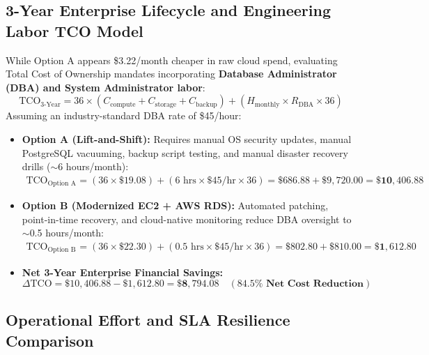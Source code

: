 \documentclass[11pt,a4paper]{article}
\begin{document}
\subsection{3-Year Enterprise Lifecycle and Engineering Labor TCO Model}
While Option A appears \$3.22/month cheaper in raw cloud spend, evaluating Total Cost of Ownership mandates incorporating \textbf{Database Administrator (DBA) and System Administrator labor}:
\begin{equation}
    \text{TCO}_{\text{3-Year}} = 36 \times \left( C_{\text{compute}} + C_{\text{storage}} + C_{\text{backup}} \right) + \left( H_{\text{monthly}} \times R_{\text{DBA}} \times 36 \right)
\end{equation}
Assuming an industry-standard DBA rate of \$45/hour:
\begin{itemize}[leftmargin=*]
    \item \textbf{Option A (Lift-and-Shift):} Requires manual OS security updates, manual PostgreSQL vacuuming, backup script testing, and manual disaster recovery drills ($\sim$6 hours/month):
    \begin{align}
        \text{TCO}_{\text{Option A}} &= (36 \times \$19.08) + (6 \text{ hrs} \times \$45/\text{hr} \times 36) = \$686.88 + \$9,720.00 = \mathbf{\$10,406.88}
    \end{align}
    \item \textbf{Option B (Modernized EC2 + AWS RDS):} Automated patching, point-in-time recovery, and cloud-native monitoring reduce DBA oversight to $\sim$0.5 hours/month:
    \begin{align}
        \text{TCO}_{\text{Option B}} &= (36 \times \$22.30) + (0.5 \text{ hrs} \times \$45/\text{hr} \times 36) = \$802.80 + \$810.00 = \mathbf{\$1,612.80}
    \end{align}
    \item \textbf{Net 3-Year Enterprise Financial Savings:}
    \begin{equation}
        \Delta \text{TCO} = \$10,406.88 - \$1,612.80 = \mathbf{\$8,794.08} \quad \left( \mathbf{84.5\% \text{ Net Cost Reduction}} \right)
    \end{equation}
\end{itemize}

\subsection{Operational Effort and SLA Resilience Comparison}
\end{document}
